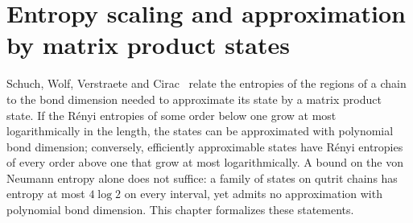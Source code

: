 \chapter{Entropy scaling and approximation by matrix product states}
\label{ch:entropy_scaling}

Schuch, Wolf, Verstraete and Cirac~\cite{Schuch2008EntropyScaling} relate
the entropies of the regions of a chain to the bond dimension needed to
approximate its state by a matrix product state. If the R\'enyi entropies of
some order below one grow at most logarithmically in the length, the states
can be approximated with polynomial bond dimension; conversely, efficiently
approximable states have R\'enyi entropies of every order above one that grow
at most logarithmically. A bound on the von Neumann entropy alone does not
suffice: a family of states on qutrit chains has entropy at most $4\log2$
on every interval, yet admits no approximation with polynomial bond
dimension. This chapter formalizes these statements.









